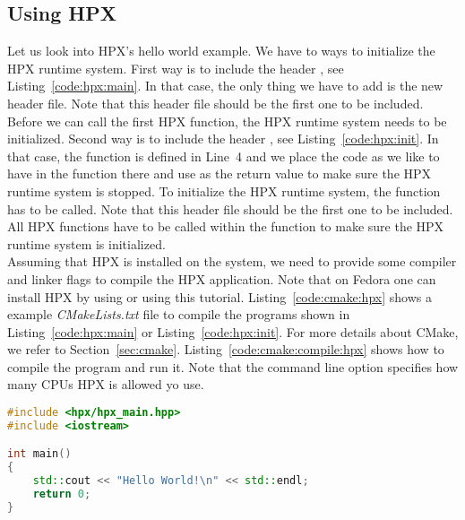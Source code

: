 \subsection{Using HPX}
\label{sec:hpx:using}
Let us look into HPX's hello world example. We have to ways to initialize the HPX runtime system. First way is to include the header , see Listing~\ref{code:hpx:main}. In that case, the only thing we have to add is the new header file. Note that this header file should be the first one to be included. Before we can call the first HPX function, the HPX runtime system needs to be initialized. Second way is to include the header , see Listing~\ref{code:hpx:init}. In that case, the  function is defined in Line~4 and we place the code as we like to have in the  function there and use  as the return value to make sure the HPX runtime system is stopped. To initialize the HPX runtime system, the function  has to be called. Note that this header file should be the first one to be included. All HPX functions have to be called within the  function to make sure the HPX runtime system is initialized. \\

Assuming that HPX is installed on the system, we need to provide some compiler and linker flags to compile the HPX application. Note that on Fedora one can install HPX by using  or using this
tutorial. Listing~\ref{code:cmake:hpx} shows a example \textit{CMakeLists.txt} file to compile the programs shown in Listing~\ref{code:hpx:main} or Listing~\ref{code:hpx:init}. For more details about CMake, we refer to Section~\ref{sec:cmake}. Listing~\ref{code:cmake:compile:hpx} shows how to compile the program and run it. Note that the command line option  specifies how many CPUs HPX is allowed yo use. 


\begin{lstlisting}[language=c++,caption={Initializing the HPX runtime system (I).\label{code:hpx:main}},float,floatplacement=tb]
#include <hpx/hpx_main.hpp>
#include <iostream>

int main()
{
    std::cout << "Hello World!\n" << std::endl;
    return 0;
}
\end{lstlisting}



